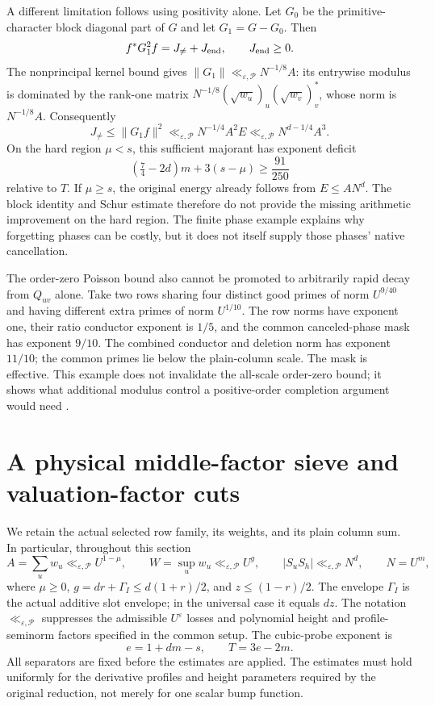 \documentclass[11pt]{article}
\theoremstyle{definition}
\newcommand{\N}{\mathrm N}
\newcommand{\eps}{\varepsilon}
\newcommand{\lls}{\ll_{\eps,\mathcal P}}
\begin{document}
A different limitation follows using positivity alone. Let $G_0$ be the primitive-character block diagonal part of $G$ and let $G_1=G-G_0$. Then
\[
 f^*G_1^2f=J_{\ne}+J_{\rm end},\qquad J_{\rm end}\ge0.
\]
The nonprincipal kernel bound gives $\|G_1\|\lls N^{-1/8}A$: its entrywise modulus is dominated by the rank-one matrix $N^{-1/8}(\sqrt{w_u})_u(\sqrt{w_v})_v^*$, whose norm is $N^{-1/8}A$. Consequently
\[
 J_{\ne}\le\|G_1f\|^2\lls N^{-1/4}A^2E
 \lls N^{d-1/4}A^3.
\]
On the hard region $\mu<s$, this sufficient majorant has exponent deficit
\[
 (\tfrac74-2d)m+3(s-\mu)\ge\frac{91}{250}
\]
relative to $T$. If $\mu\ge s$, the original energy already follows from $E\le AN^d$. The block identity and Schur estimate therefore do not provide the missing arithmetic improvement on the hard region. The finite phase example explains why forgetting phases can be costly, but it does not itself supply those phases' native cancellation.

The order-zero Poisson bound also cannot be promoted to arbitrarily rapid decay from $Q_{uv}$ alone. Take two rows sharing four distinct good primes of norm $U^{9/40}$ and having different extra primes of norm $U^{1/10}$. The row norms have exponent one, their ratio conductor exponent is $1/5$, and the common canceled-phase mask has exponent $9/10$. The combined conductor and deletion norm has exponent $11/10$; the common primes lie below the plain-column scale. The mask is effective. This example does not invalidate the all-scale order-zero bound; it shows what additional modulus control a positive-order completion argument would need \cite{n4,n5}.


\section{A physical middle-factor sieve and valuation-factor cuts}
\label{late-sec-middle}

We retain the actual selected row family, its weights, and its plain
column sum.  In particular, throughout this section
\[
 A=\sum_u w_u\lls U^{1-\mu},\qquad
 W=\sup_u w_u\lls U^g,\qquad
 |S_uS_h|\lls N^d,\qquad N=U^m,
\]
where $\mu\ge0$, $g=dr+\Gamma_I\le d(1+r)/2$, and
$z\le(1-r)/2$.  The envelope $\Gamma_I$ is the actual additive
slot envelope; in the universal case it equals $dz$.
The notation $\lls$ suppresses the admissible $U^\eps$ losses and
polynomial height and profile-seminorm factors specified in the common
setup.  The cubic-probe exponent is
\[
 e=1+dm-s,\qquad T=3e-2m.
\]
All separators are fixed before the estimates are applied.  The
estimates must hold uniformly for the derivative profiles and height
parameters required by the original reduction, not merely for one
scalar bump function.
\end{document}
